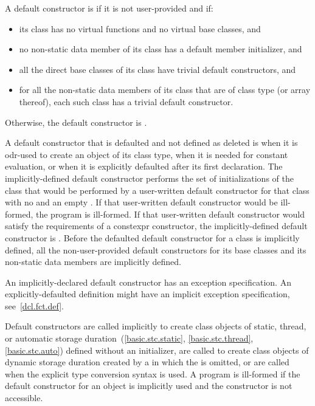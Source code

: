 \pnum
A default constructor is
if it is not user-provided and if:
\begin{itemize}
\item
its class has no virtual functions and no virtual base
classes, and

\item no non-static data member of its class has
a default member initializer, and

\item
all the direct base classes of its class have trivial default constructors, and

\item
for all the non-static data members of its class that are of class
type (or array thereof), each such class has a trivial default constructor.
\end{itemize}

Otherwise, the default constructor is
.

\pnum
A default constructor
that is defaulted and not defined as deleted
is
when it is odr-used
to create an object of its class type,
when it is needed for constant evaluation, or
when it is explicitly defaulted after its first declaration.
The implicitly-defined default constructor performs the set of
initializations of the class that would be performed by a user-written default
constructor for that class with no
 and an empty
.
If that user-written default constructor would be ill-formed,
the program is ill-formed.
If that user-written default constructor would satisfy the requirements
of a constexpr constructor, the implicitly-defined
default constructor is .
Before the defaulted default constructor for a class is
implicitly defined,
all the non-user-provided default constructors for its base classes and
its non-static data members are implicitly defined.
\begin{note}
An implicitly-declared default constructor has an
exception specification.
An explicitly-defaulted definition might have an
implicit exception specification, see~\ref{dcl.fct.def}.
\end{note}

\pnum
{}%
Default constructors are called implicitly to create class objects of static, thread,
or automatic storage duration~(\ref{basic.stc.static}, \ref{basic.stc.thread}, \ref{basic.stc.auto}) defined
without an initializer,
are called to create class objects of dynamic storage duration created by a
in which the
is omitted, or
are called when the explicit type conversion syntax is
used.
A program is ill-formed if the default constructor for an object
is implicitly used and the constructor is not accessible.

